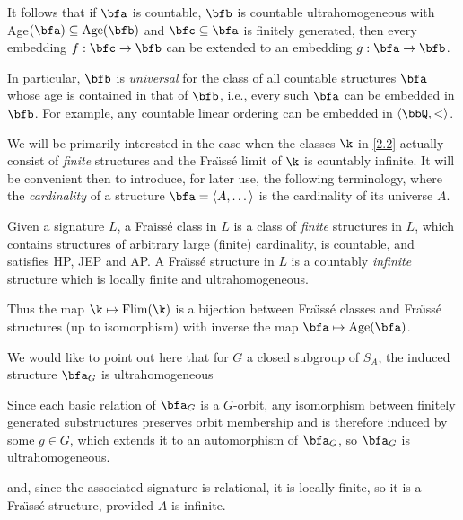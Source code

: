 It follows that if $\bfa$ is countable, $\bfb$ is countable ultrahomogeneous
with Age$(\bfa )\subseteq {\rm Age} (\bfb )$ and $\bfc\subseteq\bfa$ is
finitely generated, then every embedding $f:\bfc\rightarrow\bfb$ can be
extended to an embedding $g:{\bfa}\rightarrow {\bfb}$.

In particular, $\bfb$ is {\it universal} for the class of all countable
structures $\bfa$ whose age is contained in that of $\bfb$, i.e., every
such $\bfa$ can be embedded in $\bfb$.  For example, any countable linear
ordering can be embedded in $\langle\bbQ ,<\rangle$.

We will be primarily interested in the case when the classes $\k$ in \ref{2.2}
actually consist of {\it finite} structures and the Fra\"{\i}ss\'{e}
limit of $\k$ is countably infinite.  It will be convenient then to
introduce, for later use, the following terminology, where the {\it
        cardinality} of a structure $\bfa =\langle A,\dots\rangle$ is the
cardinality of its universe $A$.

\begin{definition}
    \label{2.4}
    Given a signature $L$, a {\rm Fra\"{\i}ss\'{e}
    class} in $L$ is a class of {\it finite} structures in $L$, which
    contains structures of arbitrary
    large (finite) cardinality, is countable, and satisfies HP, JEP and AP.  A
    {\rm Fra\"{\i}ss\'{e} structure} in $L$ is a countably {\it infinite} structure
    which is locally finite and ultrahomogeneous.
\end{definition}

Thus the map $\k\mapsto{\rm Flim} (\k )$ is a bijection between Fra\"{\i}ss\'{e}
classes and Fra\"{\i}ss\'{e} structures (up to isomorphism) with inverse the
map $\bfa\mapsto {\rm Age} (\bfa )$.

We would like to point out here that for $G$ a closed subgroup of $S_A$,
the induced structure $\bfa_G$ is ultrahomogeneous

\begin{mynote}
    Since each basic relation of $\bfa_G$ is a $G$-orbit, any isomorphism between finitely generated substructures preserves orbit membership and is therefore induced by some $g\in G$, which extends it to an automorphism of $\bfa_G$, so $\bfa_G$ is ultrahomogeneous.
\end{mynote}

and, since the
associated signature is relational, it is locally finite, so it is a Fra\"{\i}ss\'{e}
structure, provided $A$ is infinite.

